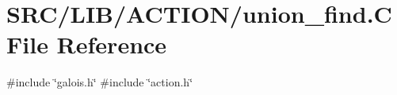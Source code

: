 \hypertarget{union__find_8_c}{}\section{S\+R\+C/\+L\+I\+B/\+A\+C\+T\+I\+O\+N/union\+\_\+find.C File Reference}
\label{union__find_8_c}
{\ttfamily \#include \char`\"{}galois.\+h\char`\"{}}\newline
{\ttfamily \#include \char`\"{}action.\+h\char`\"{}}\newline
